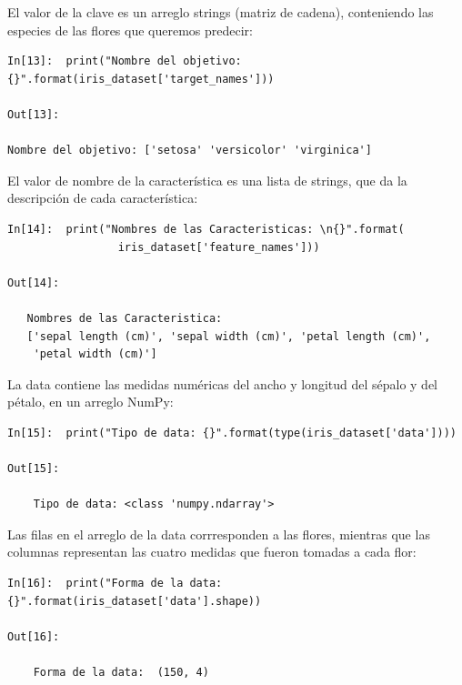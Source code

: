 El valor de la clave  {} es un arreglo  strings (matriz de cadena), conteniendo las especies de  las flores que queremos predecir:\\

\begin{lstlisting}
In[13]:  print("Nombre del objetivo: {}".format(iris_dataset['target_names']))

Out[13]:

Nombre del objetivo: ['setosa' 'versicolor' 'virginica']
\end{lstlisting}



El valor de {}  nombre de la característica es una lista de strings, que da la descripción de cada característica:\\

\begin{lstlisting}
In[14]:  print("Nombres de las Caracteristicas: \n{}".format(
                 iris_dataset['feature_names']))

Out[14]:

   Nombres de las Caracteristica:
   ['sepal length (cm)', 'sepal width (cm)', 'petal length (cm)',
    'petal width (cm)']
\end{lstlisting}

La data  contiene las medidas numéricas del ancho y longitud del sépalo y del pétalo,
  en un arreglo NumPy:\\


\begin{lstlisting}
In[15]:  print("Tipo de data: {}".format(type(iris_dataset['data'])))

Out[15]:

    Tipo de data: <class 'numpy.ndarray'>
\end{lstlisting}


Las filas en el arreglo de la data  corrresponden a las flores, mientras que las columnas representan las cuatro medidas que fueron tomadas a cada flor: 





\begin{lstlisting}
In[16]:  print("Forma de la data:  {}".format(iris_dataset['data'].shape))

Out[16]:
  
    Forma de la data:  (150, 4)
\end{lstlisting}



